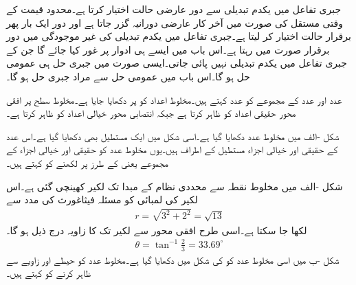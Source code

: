 جبری تفاعل میں یکدم تبدیلی سے دور عارضی حالت اختیار کرتا ہے۔محدود قیمت کے وقتی مستقل کی صورت میں آخر کار عارضی دورانیہ گزر جاتا ہے اور دور ایک بار پھر برقرار حالت اختیار کر لیتا ہے۔جبری تفاعل میں یکدم تبدیلی کی غیر موجودگی میں دور برقرار صورت میں رہتا ہے۔اس باب میں ایسے ہی ادوار پر غور کیا جائے گا جن کے جبری تفاعل میں یکدم تبدیلی نہیں پائی جاتی۔ایسی صورت میں جبری حل ہی عمومی حل ہو گا۔اس باب میں عمومی حل  سے مراد جبری حل ہو گا۔ 
 
 عدد اور  عدد کے مجموعے کو  عدد کہتے ہیں۔مخلوط اعداد کو  پر دکھایا جایا ہے۔مخلوط سطح پر افقی محور  حقیقی اعداد کو ظاہر کرتا ہے جبکہ انتصابی محور  خیالی اعداد کو ظاہر کرتا ہے۔

شکل -الف میں مخلوط عدد  دکھایا گیا ہے۔اسی شکل میں ایک مستطیل بھی دکھایا گیا ہے۔اس عدد کے حقیقی اور خیالی اجزاء مستطیل کے اطراف ہیں۔یوں مخلوط عدد کو حقیقی اور خیالی اجزاء کے مجموعے یعنی  کے طرز پر لکھنے کو  کہتے ہیں۔ 

شکل -الف میں مخلوط نقطہ  سے محددی نظام  کے مبدا  تک لکیر کھینچی گئی ہے۔اس لکیر کی لمبائی  کو مسئلہ فیثاغورث کی مدد سے
\begin{align*}
r=\sqrt{3^2+2^2}=\sqrt{13}
\end{align*}
لکھا جا سکتا ہے۔اسی طرح افقی محور سے لکیر تک کا زاویہ درج ذیل ہو گا۔
\begin{align*}
\theta=\tan^{-1}\frac{2}{3}=33.69^{\circ}
\end{align*}
شکل -ب میں اسی مخلوط عدد کو  کی شکل میں دکھایا گیا ہے۔مخلوط عدد کو حیطے اور زاویے سے ظاہر کرنے کو  کہتے ہیں۔

